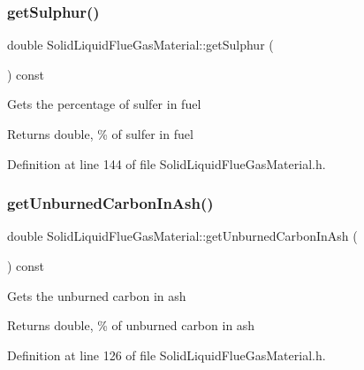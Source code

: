 \subsubsection{\texorpdfstring{get\+Sulphur()}{getSulphur()}\hspace{0.1cm}{\footnotesize\ttfamily [3/3]}}
{\footnotesize\ttfamily double Solid\+Liquid\+Flue\+Gas\+Material\+::get\+Sulphur (\begin{DoxyParamCaption}{ }\end{DoxyParamCaption}) const\hspace{0.3cm}{\ttfamily [inline]}}

Gets the percentage of sulfer in fuel \begin{DoxyReturn}{Returns}
double, \% of sulfer in fuel 
\end{DoxyReturn}


Definition at line 144 of file Solid\+Liquid\+Flue\+Gas\+Material.\+h.

\mbox{\label{class_solid_liquid_flue_gas_material_a53ac34a949168a35297ab3afb9eb2c7b}} 
\subsubsection{\texorpdfstring{get\+Unburned\+Carbon\+In\+Ash()}{getUnburnedCarbonInAsh()}\hspace{0.1cm}{\footnotesize\ttfamily [1/3]}}
{\footnotesize\ttfamily double Solid\+Liquid\+Flue\+Gas\+Material\+::get\+Unburned\+Carbon\+In\+Ash (\begin{DoxyParamCaption}{ }\end{DoxyParamCaption}) const\hspace{0.3cm}{\ttfamily [inline]}}

Gets the unburned carbon in ash \begin{DoxyReturn}{Returns}
double, \% of unburned carbon in ash 
\end{DoxyReturn}


Definition at line 126 of file Solid\+Liquid\+Flue\+Gas\+Material.\+h.

\mbox{\label{class_solid_liquid_flue_gas_material_a53ac34a949168a35297ab3afb9eb2c7b}} 
